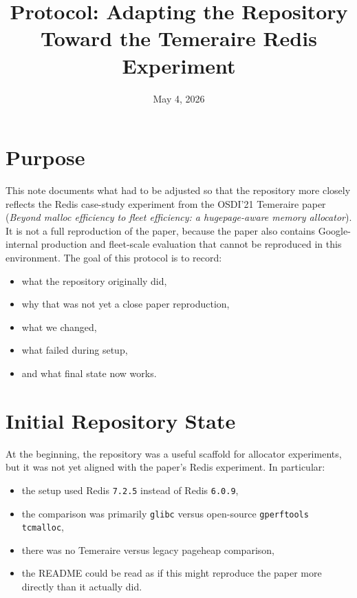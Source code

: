 \documentclass[a4paper,11pt]{article}
\title{Protocol: Adapting the Repository Toward the Temeraire Redis Experiment}
\author{}
\date{May 4, 2026}
\begin{document}
\maketitle

\section{Purpose}

This note documents what had to be adjusted so that the repository more closely reflects the Redis case-study experiment from the OSDI'21 Temeraire paper
(\emph{Beyond malloc efficiency to fleet efficiency: a hugepage-aware memory allocator}).
It is not a full reproduction of the paper, because the paper also contains Google-internal production and fleet-scale evaluation that cannot be reproduced in this environment.
The goal of this protocol is to record:

\begin{itemize}[leftmargin=1.5em]
  \item what the repository originally did,
  \item why that was not yet a close paper reproduction,
  \item what we changed,
  \item what failed during setup,
  \item and what final state now works.
\end{itemize}

\section{Initial Repository State}

At the beginning, the repository was a useful scaffold for allocator experiments, but it was not yet aligned with the paper's Redis experiment.
In particular:

\begin{itemize}[leftmargin=1.5em]
  \item the setup used Redis \texttt{7.2.5} instead of Redis \texttt{6.0.9},
  \item the comparison was primarily \texttt{glibc} versus open-source \texttt{gperftools} \texttt{tcmalloc},
  \item there was no Temeraire versus legacy pageheap comparison,
  \item the README could be read as if this might reproduce the paper more directly than it actually did.
\end{itemize}
\end{document}
